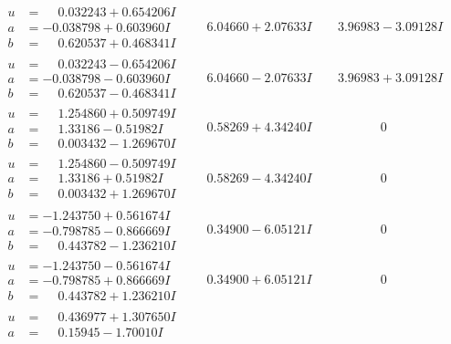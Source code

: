 \documentclass[1p]{elsarticle_modified}
\theoremstyle{definition}
\begin{document}
$$\begin{array}{c|c|c}
\begin{aligned}
u &= \phantom{-}0.032243 + 0.654206 I \\
a &= -0.038798 + 0.603960 I \\
b &= \phantom{-}0.620537 + 0.468341 I\end{aligned}
 & \phantom{-}6.04660 + 2.07633 I & \phantom{-}3.96983 - 3.09128 I \\ \hline\begin{aligned}
u &= \phantom{-}0.032243 - 0.654206 I \\
a &= -0.038798 - 0.603960 I \\
b &= \phantom{-}0.620537 - 0.468341 I\end{aligned}
 & \phantom{-}6.04660 - 2.07633 I & \phantom{-}3.96983 + 3.09128 I \\ \hline\begin{aligned}
u &= \phantom{-}1.254860 + 0.509749 I \\
a &= \phantom{-}1.33186 - 0.51982 I \\
b &= \phantom{-}0.003432 - 1.269670 I\end{aligned}
 & \phantom{-}0.58269 + 4.34240 I & \phantom{-0.000000 } 0 \\ \hline\begin{aligned}
u &= \phantom{-}1.254860 - 0.509749 I \\
a &= \phantom{-}1.33186 + 0.51982 I \\
b &= \phantom{-}0.003432 + 1.269670 I\end{aligned}
 & \phantom{-}0.58269 - 4.34240 I & \phantom{-0.000000 } 0 \\ \hline\begin{aligned}
u &= -1.243750 + 0.561674 I \\
a &= -0.798785 - 0.866669 I \\
b &= \phantom{-}0.443782 - 1.236210 I\end{aligned}
 & \phantom{-}0.34900 - 6.05121 I & \phantom{-0.000000 } 0 \\ \hline\begin{aligned}
u &= -1.243750 - 0.561674 I \\
a &= -0.798785 + 0.866669 I \\
b &= \phantom{-}0.443782 + 1.236210 I\end{aligned}
 & \phantom{-}0.34900 + 6.05121 I & \phantom{-0.000000 } 0 \\ \hline\begin{aligned}
u &= \phantom{-}0.436977 + 1.307650 I \\
a &= \phantom{-}0.15945 - 1.70010 I \\

\end{aligned}
\end{array}$$
\end{document}

